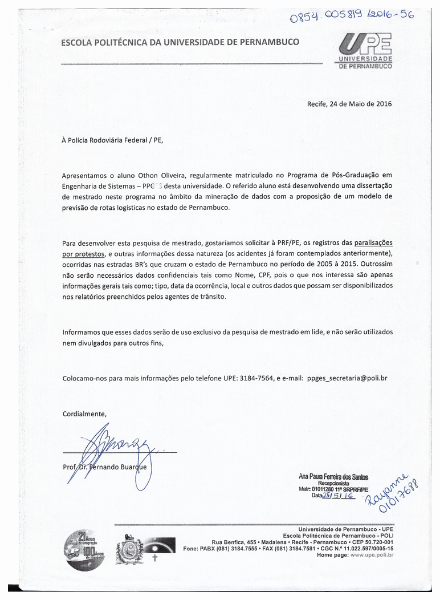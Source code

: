 \begin{figure}[ht!]
		\includegraphics[scale=0.25]{Figuras/Anexos/A1-PRFDadospg_003.pdf}
		\qquad \quad \quad

\end{figure}
